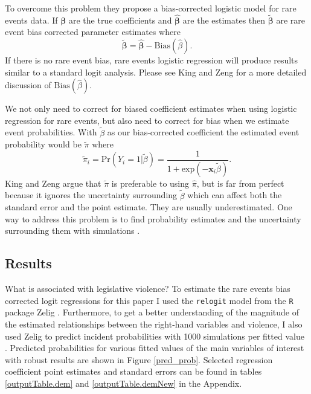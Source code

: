 \documentclass[a4paper]{article}\usepackage{graphicx, color}
\begin{document}
To overcome this problem they propose a bias-corrected logistic model for rare events data. If $\mathbf{\beta}$ are the true coefficients and $\mathbf{\hat\beta}$ are the estimates then $\mathbf{\tilde\beta}$ are rare event bias corrected parameter estimates where 
%
\begin{equation}
    \mathbf{\tilde\beta} = \mathbf{\hat\beta} - \mathrm{Bias}(\hat\beta). 
\end{equation}
%
If there is no rare event bias, rare events logistic regression will produce results similar to a standard logit analysis. Please see King and Zeng \citep[147--148]{KingRareEventsPA2001} for a more detailed discussion of $\mathrm{Bias}(\hat\beta)$.

We not only need to correct for biased coefficient estimates when using logistic regression for rare events, but also need to correct for bias when we estimate event probabilities. With $\tilde\beta$ as our bias-corrected coefficient the estimated event probability would be $\tilde\pi$ where
%
\begin{equation}
    \tilde\pi_{i} = \mathrm{Pr}(Y_{i} = 1 | \tilde\beta) = \frac{1}{1 + \mathrm{exp}(-\mathbf{x}_{i} \tilde\beta)}.
\end{equation}
% 
King and Zeng \citeyearpar[148--150]{KingRareEventsPA2001} argue that $\tilde\pi$ is preferable to using $\hat\pi$, but is far from perfect because it ignores the uncertainty surrounding $\tilde\beta$ which can affect both the standard error and the point estimate. They are usually underestimated. One way to address this problem is to find probability estimates and the uncertainty surrounding them with simulations \citep[see][]{King2000}.



\subsection{Results}

What is associated with legislative violence? To estimate the rare events bias corrected logit regressions for this paper I used the {\tt{relogit}} model from the {\tt{R}} package Zelig \citep{IMAIKingZelig2008}. Furthermore, to get a better understanding of the magnitude of the estimated relationships between the right-hand variables and violence, I also used Zelig to predict incident probabilities with 1000 simulations per fitted value \citep[see][]{King2002}. Predicted probabilities for various fitted values of the main variables of interest with robust results are shown in Figure \ref{pred_prob}. Selected regression coefficient point estimates and standard errors can be found in tables \ref{outputTable.dem} and \ref{outputTable.demNew} in the Appendix. 
\end{document}

